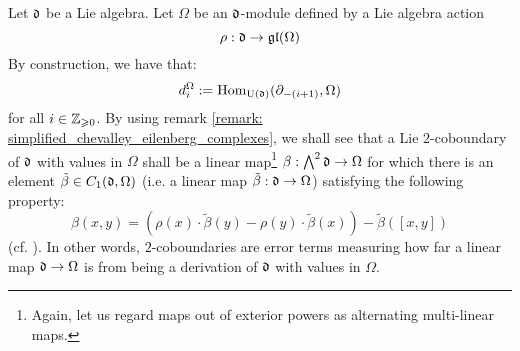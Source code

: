         \begin{example} \label{example: low_degree_lie_coboundaries_with_non_trivial_coefficients}
            Let $\mathfrak{d}$ be a Lie algebra. Let $\Omega$ be an $\mathfrak{d}$-module defined by a Lie algebra action
                $$\rho: \mathfrak{d} \to \mathfrak{gl}(\Omega)$$
            By construction, we have that:
                $$d_i^\Omega := \mathrm{Hom}_{\mathrm{U}(\mathfrak{d})}(\partial_{-(i + 1)}, \Omega)$$
            for all $i \in \mathbb{Z}_{\geqslant 0}$. By using remark \ref{remark: simplified_chevalley_eilenberg_complexes}, we shall see that a Lie $2$-coboundary of $\mathfrak{d}$ with values in $\Omega$ shall be a linear map\footnote{Again, let us regard maps out of exterior powers as alternating multi-linear maps.} $\beta: \bigwedge^2 \mathfrak{d} \to \Omega$ for which there is an element $\tilde{\beta} \in C_1(\mathfrak{d}, \Omega)$ (i.e. a linear map $\tilde{\beta}: \mathfrak{d} \to \Omega$) satisfying the following property:
                $$\beta(x, y) = \left( \rho(x) \cdot \tilde{\beta}(y) - \rho(y) \cdot \tilde{\beta}(x) \right) - \tilde{\beta}([x, y])$$
            (cf. \cite[Equation 1.6, p. 421]{kassel_quantum_groups}). In other words, $2$-coboundaries are error terms measuring how far a linear map $\mathfrak{d} \to \Omega$ is from being a derivation of $\mathfrak{d}$ with values in $\Omega$.
        \end{example}

